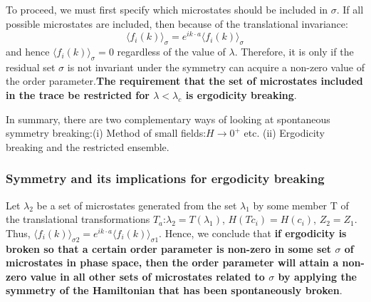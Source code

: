 \documentclass[12pt,titlepage]{article}
\numberwithin{equation}{section}
\begin{document}
To proceed, we must first specify which microstates should be included in $\sigma$. If all possible microstates are included, then because of the translational invariance:
\begin{equation}
    \langle f _ { i } ( k ) \rangle _ { \sigma } = e ^ { i k \cdot a } \langle f _ { i } ( k ) \rangle _ { \sigma }
\end{equation}
and hence $\langle f _ { i } ( k ) \rangle _ { \sigma }= 0$ regardless of the value of $\lambda$. Therefore, it is only if the residual set $\sigma$ is not invariant under the symmetry can acquire a non-zero value of the order parameter.\textbf{The requirement that the set of microstates included in the trace be restricted for $\lambda<\lambda_c$ is ergodicity breaking}.

In summary, there are two complementary ways of looking at spontaneous symmetry breaking:(i) Method of small fields:$H\rightarrow0^+$ etc. (ii) Ergodicity breaking and the restricted ensemble.

\subsubsection{Symmetry and its implications for ergodicity breaking}
Let $\lambda_2$ be a set of microstates generated from the set $\lambda_1$ by some member T of the translational transformations $T_a$:$\lambda_2=T(\lambda_1)$, $H(Tc_i)=H(c_i)$, $Z_2=Z_1$. Thus, $\langle f _ { i } ( k ) \rangle _ { \sigma2 }=e^{ik\cdot a}\langle f _ { i } ( k ) \rangle _ { \sigma1 }$. Hence, we conclude that \textbf{if ergodicity is broken so that a certain order parameter is non-zero in some set $\sigma$ of microstates in phase space, then the order parameter will attain a non-zero value in all other sets of microstates related to $\sigma$ by applying the symmetry of the Hamiltonian that has been spontaneously broken}.



\end{document}
